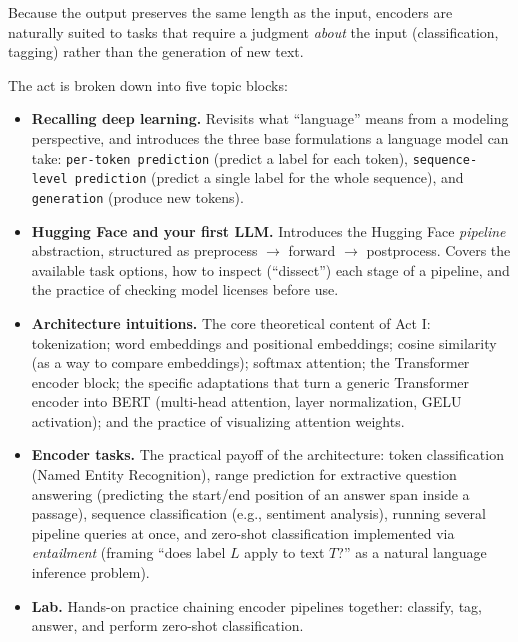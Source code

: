  Because the output preserves the same length as the input, encoders are naturally suited to tasks that require a judgment \emph{about} the input (classification, tagging) rather than the generation of new text.

The act is broken down into five topic blocks:

\begin{itemize}
    \item \textbf{Recalling deep learning.} Revisits what ``language'' means from a modeling perspective, and introduces the three base formulations a language model can take: \texttt{per-token prediction} (predict a label for each token), \texttt{sequence-level prediction} (predict a single label for the whole sequence), and \texttt{generation} (produce new tokens).

    \vspace{0.2cm}
    \item \textbf{Hugging Face and your first LLM.} Introduces the Hugging Face \emph{pipeline} abstraction, structured as preprocess $\rightarrow$ forward $\rightarrow$ postprocess. Covers the available task options, how to inspect (``dissect'') each stage of a pipeline, and the practice of checking model licenses before use.

    \vspace{0.2cm}
    \item \textbf{Architecture intuitions.} The core theoretical content of Act I: tokenization; word embeddings and positional embeddings; cosine similarity (as a way to compare embeddings); softmax attention; the Transformer encoder block; the specific adaptations that turn a generic Transformer encoder into BERT (multi-head attention, layer normalization, GELU activation); and the practice of visualizing attention weights.

    \vspace{0.2cm}
    \item \textbf{Encoder tasks.} The practical payoff of the architecture: token classification (Named Entity Recognition), range prediction for extractive question answering (predicting the start/end position of an answer span inside a passage), sequence classification (e.g., sentiment analysis), running several pipeline queries at once, and zero-shot classification implemented via \emph{entailment} (framing ``does label $L$ apply to text $T$?'' as a natural language inference problem).

    \vspace{0.2cm}
    \item \textbf{Lab.} Hands-on practice chaining encoder pipelines together: classify, tag, answer, and perform zero-shot classification.
\end{itemize}

